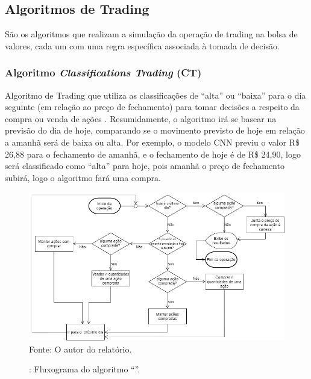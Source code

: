 \subsection{\textbf{Algoritmos de Trading}}

São os algoritmos que realizam a simulação da operação de trading na bolsa de valores, cada um com uma regra específica associada à tomada de decisão.


\subsubsection{Algoritmo \textit{Classifications Trading} (CT)}

\par
Algoritmo de Trading que utiliza as classificações de “alta” ou “baixa” para o dia seguinte (em relação ao preço de fechamento) para tomar decisões a respeito da compra ou venda de ações \cite{ritzmann}. Resumidamente, o algoritmo irá se basear na previsão do dia de hoje, comparando se o movimento previsto de hoje em relação a amanhã será de baixa ou alta. Por exemplo, o modelo CNN previu o valor R\$ 26,88 para o fechamento de amanhã, e o fechamento de hoje é de R\$ 24,90, logo será classificado como “alta” para hoje, pois amanhã o preço de fechamento subirá, logo o algoritmo fará uma compra.


\begin{figure}[hbt]
\centering
\caption{\label{figure:figura1}: Fluxograma do algoritmo “”.}
  \includegraphics[scale=0.55]{figures/Classifications_Trading.png}
  Fonte: O autor do relatório.
\end{figure}


